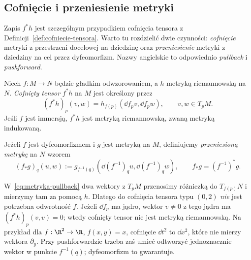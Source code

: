 \subsection*{Cofnięcie i przeniesienie metryki}

Zapis $f^*h$ jest szczególnym przypadkiem cofnięcia
tensora z Definicji~\ref{def:cofniecie-tensora}.
Warto tu rozdzielić dwie czynności: \emph{cofnięcie}
metryki z przestrzeni docelowej na dziedzinę oraz
\emph{przeniesienie} metryki z dziedziny na cel przez
dyfeomorfizm. Nazwy angielskie to odpowiednio
\emph{pullback} i \emph{pushforward}.

\begin{definicja}
\label{def:metryka-pullback-pushforward}
Niech $f:M\to N$ będzie gładkim odwzorowaniem, a $h$
metryką riemannowską na $N$. \emph{Cofnięty tensor}
$f^*h$ na $M$ jest określony przez
\begin{equation}\label{eq:metryka-pullback}
 (f^*h)_p(v,w)
 =h_{f(p)}(\dd f_pv,\dd f_pw),
 \qquad v,w\in T_pM.
\end{equation}
Jeśli $f$ jest immersją, $f^*h$ jest metryką
riemannowską, zwaną metryką indukowaną.

Jeżeli $f$ jest dyfeomorfizmem i $g$ jest metryką
na $M$, definiujemy \emph{przeniesioną metrykę}
na $N$ wzorem
\begin{equation}\label{eq:metryka-pushforward}
 (f_*g)_q(u,w)
 :=g_{f^{-1}(q)}(\dd(f^{-1})_q u,
                    \dd(f^{-1})_q w),
 \qquad f_*g=(f^{-1})^*g.
\end{equation}
\end{definicja}

W~\eqref{eq:metryka-pullback} dwa wektory z $T_pM$
przenosimy różniczką do $T_{f(p)}N$ i mierzymy tam
za pomocą $h$. Dlatego do cofnięcia tensora typu
$(0,2)$ \emph{nie} jest potrzebna odwrotność $f$.
Jeżeli $\dd f_p$ ma jądro, wektor $v\ne0$ z tego
jądra ma $(f^*h)_p(v,v)=0$; wtedy cofnięty tensor
nie jest metryką riemannowską. Na przykład dla
$f:\R^2\to\R$, $f(x,y)=x$, cofnięcie $\dd t^2$
to $\dd x^2$, które nie mierzy wektora $\partial_y$.
Przy pushforwardzie trzeba zaś umieć odtworzyć
jednoznacznie wektor w punkcie $f^{-1}(q)$;
dyfeomorfizm to gwarantuje.

